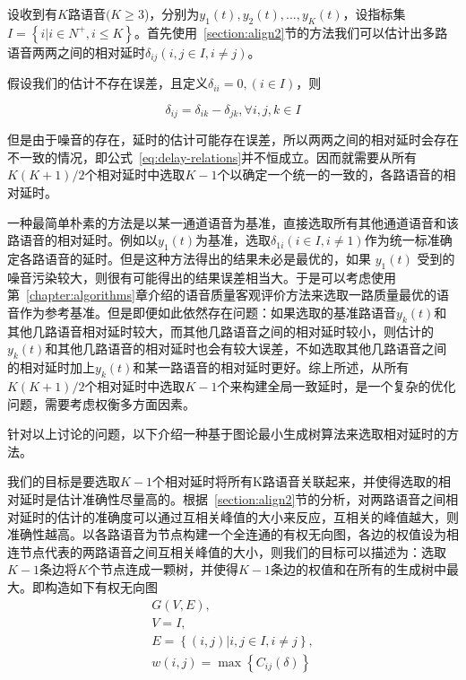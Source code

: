设收到有$K$路语音$(K\geq3$)，分别为$y_1(t), y_2(t), ..., y_K(t)$，设指标集$I=\left\{i|i\in N^+, i\leq K\right\}$。首先使用~\ref{section:align2}节的方法我们可以估计出多路语音两两之间的相对延时$\delta_{ij}  (i,j\in I,i\neq j)$。

假设我们的估计不存在误差，且定义$\delta_{ii}=0,(i \in I)$，则

\begin{equation}\label{eq:delay-relations}
\delta_{ij}=\delta_{ik}-\delta_{jk}, \forall i,j,k \in I
\end{equation}

但是由于噪音的存在，延时的估计可能存在误差，所以两两之间的相对延时会存在不一致的情况，即公式~\ref{eq:delay-relations}并不恒成立。因而就需要从所有$K(K+1)/2$个相对延时中选取$K-1$个以确定一个统一的一致的，各路语音的相对延时。

一种最简单朴素的方法是以某一通道语音为基准，直接选取所有其他通道语音和该路语音的相对延时。例如以$y_1 (t)$为基准，选取$\delta_{1i}  (i \in I, i \neq 1)$作为统一标准确定各路语音的延时。但是这种方法得出的结果未必是最优的，如果 $y_1 (t)$ 受到的噪音污染较大，则很有可能得出的结果误差相当大。于是可以考虑使用第~\ref{chapter:algorithms}章介绍的语音质量客观评价方法来选取一路质量最优的语音作为参考基准。但是即便如此依然存在问题：如果选取的基准路语音$y_k (t)$和其他几路语音相对延时较大，而其他几路语音之间的相对延时较小，则估计的$y_k (t)$和其他几路语音的相对延时也会有较大误差，不如选取其他几路语音之间的相对延时加上$y_k (t)$和某一路语音的相对延时更好。综上所述，从所有$K(K+1)/2$个相对延时中选取$K-1$个来构建全局一致延时，是一个复杂的优化问题，需要考虑权衡多方面因素。

针对以上讨论的问题，以下介绍一种基于图论最小生成树算法来选取相对延时的方法。

我们的目标是要选取$K-1$个相对延时将所有K路语音关联起来，并使得选取的相对延时是估计准确性尽量高的。根据~\ref{section:align2}节的分析，对两路语音之间相对延时的估计的准确度可以通过互相关峰值的大小来反应，互相关的峰值越大，则准确性越高。以各路语音为节点构建一个全连通的有权无向图，各边的权值设为相连节点代表的两路语音之间互相关峰值的大小，则我们的目标可以描述为：选取$K-1$条边将$K$个节点连成一颗树，并使得$K-1$条边的权值和在所有的生成树中最大。即构造如下有权无向图
\begin{equation}
\begin{array}{l}
G(V,E), \\
V = I, \\
E = \left\{(i,j)|i, j\in I, i \neq j\right\}, \\
w(i,j)=\max⁡ \left\{ C_{ij}(\delta) \right\}
\end{array}
\end{equation}


